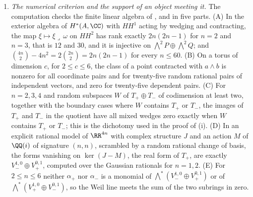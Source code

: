 \begin{enumerate}[label=\textup{(\Roman*)},leftmargin=*]
\item \emph{The numerical criterion and the support of an object meeting
  it.} The computation checks the finite linear algebra of
  ,  and 
  in five parts. (A) In the exterior algebra of
  $H^{*}(A,\CC)$ with $HH^{1}$ acting by wedging and contracting, the map
  $\xi\mapsto\xi\lrcorner\,\omega$ on $HH^{2}$ has rank exactly $2n(2n-1)$
  for $n=2$ and $n=3$, that is $12$ and $30$, and it is injective on
  $\bigwedge^{2}P\oplus\bigwedge^{2}Q$; and
  $\binom{4n}{2}-4n^{2}=2\binom{2n}{2}=2n(2n-1)$ for every $n\le60$. (B) On a
  torus of dimension $c$, for $2\le c\le6$, the class of a point contracted
  with $a\wedge b$ is nonzero for all coordinate pairs and for twenty-five
  random rational pairs of independent vectors, and zero for twenty-five
  dependent pairs. (C) For $n=2,3,4$ and random subspaces $W$ of
  $T_{+}\oplus T_{-}$ of codimension at least two, together with the boundary
  cases where $W$ contains $T_{+}$ or $T_{-}$, the images of $T_{+}$ and
  $T_{-}$ in the quotient have all mixed wedges zero exactly when $W$
  contains $T_{+}$ or $T_{-}$; this is the dichotomy used in the proof of
  (i). (D) In an explicit rational model of $\RR^{4n}$
  with complex structure $J$ and an action $M$ of $\QQ(i)$ of signature
  $(n,n)$, scrambled by a random rational change of basis, the forms
  vanishing on $\ker(J-M)$, the real form of $T_{+}$, are exactly
  $V_{-}^{1,0}\oplus V_{+}^{0,1}$, computed over the Gaussian rationals for
  $n=1,2$. (E) For $2\le n\le6$ neither $\alpha_{+}$ nor $\alpha_{-}$ is a
  monomial of $\bigwedge^{*}(V_{-}^{1,0}\oplus V_{+}^{0,1})$ or of
  $\bigwedge^{*}(V_{+}^{1,0}\oplus V_{-}^{0,1})$, so the Weil line meets the
  sum of the two subrings in zero.


\end{enumerate}

